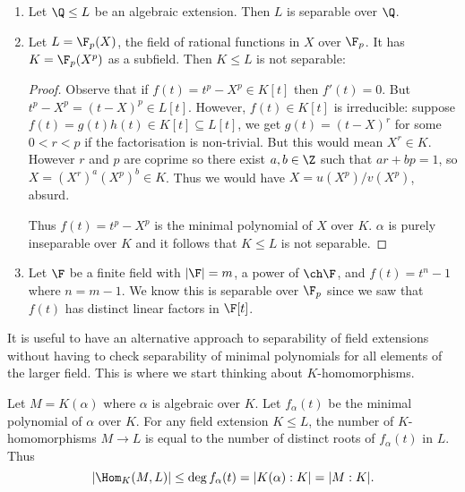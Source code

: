 \documentclass[a4paper]{article}
\begin{document}
\begin{eg}\leavevmode
  \begin{enumerate}
  \item Let \(\Q \leq L\) be an algebraic extension. Then \(L\) is separable over \(\Q\).
  \item Let \(L = \F_p(X)\), the field of rational functions in \(X\) over \(\F_p\). It has \(K = \F_p(X^p)\) as a subfield. Then \(K \leq L\) is not separable:
    \begin{proof}
      Observe that if \(f(t) = t^p - X^p \in K[t]\) then \(f'(t) = 0\). But \(t^p - X^p = (t - X)^p \in L[t]\). However, \(f(t) \in K[t]\) is irreducible: suppose \(f(t) = g(t)h(t) \in K[t] \subseteq L[t]\), we get \(g(t) = (t - X)^r\) for some \(0 < r < p\) if the factorisation is non-trivial. But this would mean \(X^r \in K\). However \(r\) and \(p\) are coprime so there exist \(a, b \in \Z\) such that \(ar + bp = 1\), so \(X = (X^r)^a (X^p)^b \in K\). Thus we would have \(X = u(X^p)/v(X^p)\), absurd.

      Thus \(f(t) = t^p - X^p\) is the minimal polynomial of \(X\) over \(K\). \(\alpha\) is purely inseparable over \(K\) and it follows that \(K \leq L\) is not separable.
    \end{proof}
  \item Let \(\F\) be a finite field with \(|\F| = m\), a power of \(\ch \F\), and \(f(t) = t^n - 1\) where \(n = m - 1\). We know this is separable over \(\F_p\) since we saw that \(f(t)\) has distinct linear factors in \(\F[t]\).
  \end{enumerate}
\end{eg}

\begin{remark}
  It is useful to have an alternative approach to separability of field extensions without having to check separability of minimal polynomials for all elements of the larger field. This is where we start thinking about \(K\)-homomorphisms.
\end{remark}

\begin{lemma}
  \label{lem:homomophism of algebraic extension}
  Let \(M = K(\alpha)\) where \(\alpha\) is algebraic over \(K\). Let \(f_\alpha(t)\) be the minimal polynomial of \(\alpha\) over \(K\). For any field extension \(K \leq L\), the number of \(K\)-homomorphisms \(M \to L\) is equal to the number of distinct roots of \(f_\alpha(t)\) in \(L\). Thus
  \[
    |\Hom_K(M, L)| \leq \deg f_\alpha(t) = |K(\alpha):K| = |M:K|.
  \]
\end{lemma}
\end{document}
